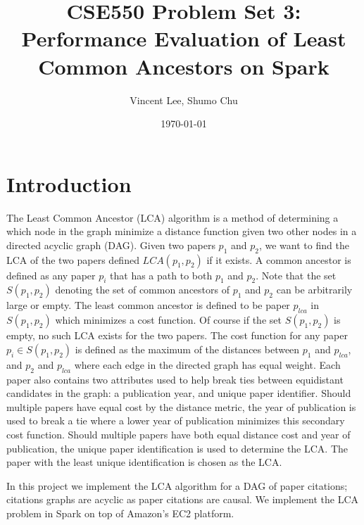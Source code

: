 \documentclass{article}
\begin{document}
\title{CSE550 Problem Set 3: Performance Evaluation of Least Common Ancestors on Spark}
\author{Vincent Lee, Shumo Chu}
\date{\today}

\maketitle

\tableofcontents


\section{Introduction}

The Least Common Ancestor (LCA) algorithm is a method of determining a which node in the graph minimize a distance function given two other nodes in a directed acyclic graph (DAG).
Given two papers $p_1$ and $p_2$, we want to find the LCA of the two papers defined $LCA(p_1, p_2)$ if it exists.
A common ancestor is defined as any paper $p_i$ that has a path to both $p_1$ and $p_2$.
Note that the set $S(p_1, p_2)$ denoting the set of common ancestors of $p_1$ and $p_2$ can be arbitrarily large or empty.
The least common ancestor is defined to be paper $p_{lca}$ in $S(p_1, p_2)$ which minimizes a cost function.
Of course if the set $S(p_1, p_2)$ is empty, no such LCA exists for the two papers.
The cost function for any paper $p_i \in S(p_1, p_2)$ is defined as the maximum of the distances between $p_1$ and $p_{lca}$, and $p_2$ and $p_{lca}$ where each edge in the directed graph has equal weight.
Each paper also contains two attributes used to help break ties between equidistant candidates in the graph: a publication year, and unique paper identifier.
Should multiple papers have equal cost by the distance metric, the year of publication is used to break a tie where a lower year of publication minimizes this secondary cost function.
Should multiple papers have both equal distance cost and year of publication, the unique paper identification is used to determine the LCA.
The paper with the least unique identification is chosen as the LCA.

In this project we implement the LCA algorithm for a DAG of paper citations; citations graphs are acyclic as paper citations are causal.
We implement the LCA problem in Spark on top of Amazon's EC2 platform.
\end{document}
